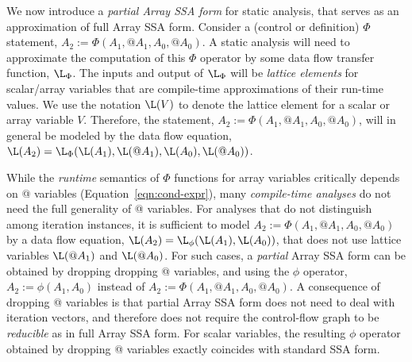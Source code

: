 We now introduce a {\it partial Array SSA form} for static analysis,
that serves as an approximation of full Array SSA form.
Consider a (control or definition) $\Phi$ statement, $A_2 := \Phi(A_1, @A_1, A_0, @A_0)$.
A static analysis will need to 
approximate
the computation of this $\Phi$ operator by 
some data flow transfer function, $\L_{\Phi}$.
The inputs and output of $\L_{\Phi}$ will be
{\it lattice elements} for scalar/array variables that
are compile-time approximations of their run-time values.
We use the notation $\L(V)$ to denote the lattice element for 
a scalar or array
variable $V$.
Therefore, the 
statement, $A_2 := \Phi(A_1, @A_1, A_0, @A_0)$, will in general
be modeled by the data flow equation,
$\L(A_2) = \L_{\Phi}(\L(A_1), \L(@A_1), \L(A_0), \L(@A_0))$.

While the  {\em runtime} semantics of 
$\Phi$ functions for array variables critically depends on @ variables (Equation~\ref{eqn:cond-expr}),
many {\em compile-time analyses} do not need the full generality of @ variables.  
For analyses that do not distinguish among iteration instances,
it is sufficient to model
$A_2 := \Phi(A_1, @A_1, A_0, @A_0)$ by
a data flow equation, $\L(A_2) = \L_{\phi}(\L(A_1), \L(A_0))$,
that does not use lattice variables $\L(@A_1)$ and $\L(@A_0)$.
For such cases, a {\it partial}
Array SSA form can be obtained by dropping 
dropping @ variables, and using the
$\phi$ operator, $A_2 := \phi(A_1, A_0)$ instead of
$A_2 := \Phi(A_1, @A_1, A_0, @A_0)$.  
A consequence of dropping @ variables is that partial Array
SSA form does not need to deal with iteration
vectors, and therefore does not require the control-flow graph to be {\it reducible} as in full Array SSA form.
For scalar variables, the resulting $\phi$ operator obtained by
dropping @ variables exactly coincides with standard SSA form.




